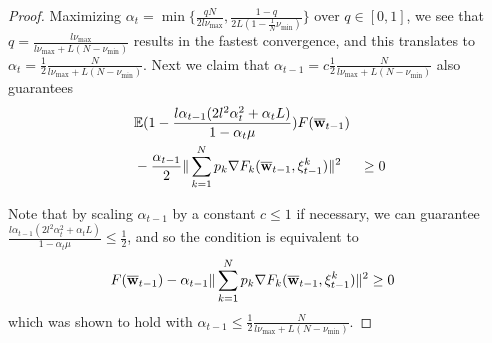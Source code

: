 \begin{proof}
	Maximizing $\alpha_{t}=\min\{\frac{qN}{2l\nu_{\max}},\frac{1-q}{2L(1-\frac{1}{N}\nu_{\min})}\}$
	over $q\in[0,1]$, we see that $q=\frac{l\nu_{\max}}{l\nu_{\max}+L(N-\nu_{\min})}$
	results in the fastest convergence, and this translates to $\alpha_{t}=\frac{1}{2}\frac{N}{l\nu_{\max}+L(N-\nu_{\min})}$.
	Next we claim that $\alpha_{t-1}=c\frac{1}{2}\frac{N}{l\nu_{\max}+L(N-\nu_{\min})}$
	also guarantees
	\begin{align*}
	&\mathbb{E}(1-\frac{l\alpha_{t-1}(2l^{2}\alpha_{t}^{2}+\alpha_{t}L)}{1-\alpha_{t}\mu})F({\overline{\mathbf{w}}}_{t-1})\\
	&-\frac{\alpha_{t-1}}{2}\|\sum_{k=1}^{N}p_{k}\nabla F_{k}({\overline{\mathbf{w}}}_{t-1},\xi_{t-1}^{k})\|^{2} & \geq0
	\end{align*}
	
	Note that by scaling $\alpha_{t-1}$ by a constant $c\leq1$ if necessary,
	we can guarantee $\frac{l\alpha_{t-1}(2l^{2}\alpha_{t}^{2}+\alpha_{t}L)}{1-\alpha_{t}\mu}\leq\frac{1}{2}$,
	and so the condition is equivalent to 
	\begin{align*}
	F({\overline{\mathbf{w}}}_{t-1})-\alpha_{t-1}\|\sum_{k=1}^{N}p_{k}\nabla F_{k}({\overline{\mathbf{w}}}_{t-1},\xi_{t-1}^{k})\|^{2} & \geq0
	\end{align*}
	which was shown to hold with $\alpha_{t-1}\leq\frac{1}{2}\frac{N}{l\nu_{\max}+L(N-\nu_{\min})}$. 
	

\end{proof}
